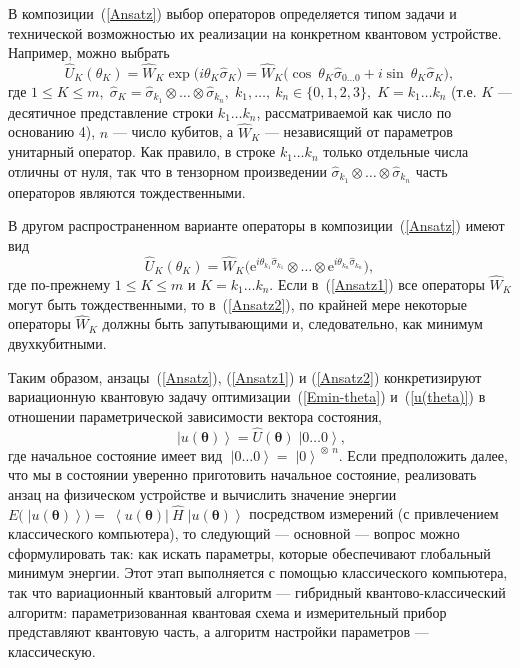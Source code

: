 \documentclass[a4paper]{report}
\newcommand{\ket}[1] {\!\!\;\ensuremath{\left|#1\right\rangle}}
\newcommand{\bra}[1] {\!\!\:\ensuremath{\left\langle#1\right|\!\!\:}}
\begin{document}
В композиции~(\ref{Ansatz}) выбор операторов определяется типом задачи и технической возможностью их реализации на конкретном квантовом устройстве. Например, можно выбрать
\begin{equation}\label{Ansatz1}
\hat{U}_{K}(\theta_K)= \hat{W}_K\exp\!\big(i\theta_K\hat{\sigma}_K\big)= \hat{W}_K\big(\cos\:\!\!\theta_K\hat{\sigma}_{0\ldots0}+ i\sin\:\!\!\theta_K\hat{\sigma}_K\big),
\end{equation}
где $1\!\leqslant\! K\!\leqslant\! m,\; \hat{\sigma}_K\!=\! \hat{\sigma}_{k_1}\!\otimes\ldots\otimes\hat{\sigma}_{k_n},\; k_1,\!\ldots,\:\!\!k_n\!\in\!\{0,1,2,3\},\; K\!=\!k_1\!\ldots k_n$\linebreak
(т.е. $K$ --- десятичное представление строки $k_1\ldots k_n$, рассматриваемой как число по основанию 4), $n$ --- число кубитов, а $\hat{W}_K$ --- независящий от параметров унитарный оператор. Как правило, в строке $k_1\ldots k_n$ только отдельные числа отличны от нуля, так что в тензорном произведении ${\hat{\sigma}_{k_1}\!\otimes\ldots \otimes \hat{\sigma}_{k_n}}$ часть операторов являются тождественными.

В другом распространенном варианте операторы в композиции~(\ref{Ansatz}) имеют вид
\begin{equation}\label{Ansatz2}
\hat{U}_{K}(\theta_K)= \hat{W}_K
\big(\mathrm{e}^{i\theta_{k_1}\hat{\sigma}_{k_1}} \otimes\ldots\otimes \mathrm{e}^{i\theta_{k_n}\hat{\sigma}_{k_n}}\big),
\end{equation}
где по-прежнему $1\!\leqslant\! K\!\leqslant\! m$ и $K\!=\!k_1\!\ldots k_n$. Если в~(\ref{Ansatz1}) все операторы $\hat{W}_K$ могут быть тождественными, то в~(\ref{Ansatz2}), по крайней мере некоторые операторы $\hat{W}_K$ должны быть запутывающими и, следовательно, как минимум двухкубитными.

Таким образом, анзацы~(\ref{Ansatz}), (\ref{Ansatz1}) и (\ref{Ansatz2}) конкретизируют вариационную квантовую задачу оптимизации~(\ref{Emin-theta}) и~(\ref{u(theta)}) в отношении параметрической зависимости вектора состояния,
\begin{equation*}
\ket{u(\bm\theta)}= \hat{U}(\bm\theta)\ket{0\ldots0},
\end{equation*}
где начальное состояние имеет вид ${\ket{0\ldots0}=\ket{0}^{\!\otimes\:\! n}}$. Если предположить далее, что мы в состоянии уверенно приготовить начальное состояние, реализовать анзац на физическом устройстве и вычислить значение энергии $E\big(\ket{u(\bm\theta)}\big)=\bra{u(\bm\theta)}\hat{H}\ket{u(\bm\theta)}$ посредством измерений (с привлечением классического компьютера), то следующий --- основной --- вопрос можно сформулировать так: как искать параметры, которые обеспечивают глобальный минимум энергии. Этот этап выполняется с помощью классического компьютера, так что вариационный квантовый алгоритм --- гибридный квантово-классический алгоритм: параметризованная квантовая схема и измерительный прибор представляют квантовую часть, а алгоритм настройки параметров — классическую.
\end{document}
